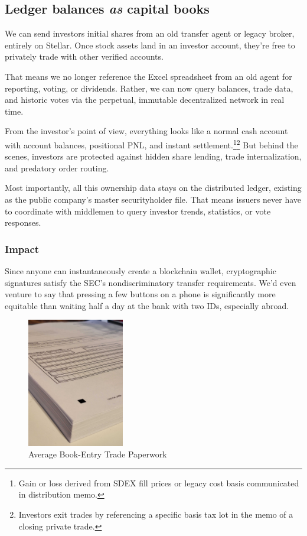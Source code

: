 \documentclass[11pt, english]{article}
\begin{document}
\begin{multicols}{2}
\subsection{Ledger balances \textit{as} capital books}

We can send investors initial shares from an old transfer agent or legacy broker, entirely on Stellar. Once stock assets land in an investor account, they're free to privately trade with other verified accounts.

That means we no longer reference the Excel spreadsheet from an old agent for reporting, voting, or dividends. Rather, we can now query balances, trade data, and historic votes via the perpetual, immutable decentralized network in real time.

From the investor's point of view, everything looks like a normal cash account with account balances, positional PNL, and instant settlement.\footnote{Gain or loss derived from SDEX fill prices or legacy cost basis communicated in distribution memo.}\footnote{Investors exit trades by referencing a specific basis tax lot in the memo of a closing private trade.} But behind the scenes, investors are protected against hidden share lending, trade internalization, and predatory order routing.

Most importantly, all this ownership data stays on the distributed ledger, existing as the public company's master securityholder file. That means issuers never have to coordinate with middlemen to query investor trends, statistics, or vote responses.

\subsubsection{Impact}

Since anyone can instantaneously create a blockchain wallet, cryptographic signatures satisfy the SEC's nondiscriminatory transfer requirements. We'd even venture to say that pressing a few buttons on a phone is significantly more equitable than waiting half a day at the bank with two IDs, especially abroad.

\begin{figure}[H]
    \centering
    \includegraphics[width=120pt]{paperwork.jpg}
    \caption{Average Book-Entry Trade Paperwork}
\end{figure}


\end{multicols}
\end{document}
